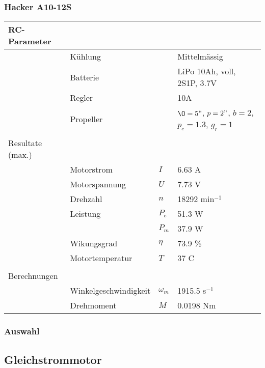 \subsubsection*{Hacker A10-12S}
\begin{table}[h!]
	\centering
	\begin{tabular}{l l l l}
		RC-Parameter & & & \\ \hline
			& Kühlung	& & Mittelmässig \\
			& Batterie	& & LiPo 10Ah, voll, 2S1P, 3.7V \\
			& Regler	& & 10A \\
			& Propeller	& & $\O=5"$, $p=2"$, $b=2$, $p_c=1.3$, $g_r=1$ \\
			& & & \\
		Resultate (max.) & & & \\ \hline
			& Motorstrom	& $I$	& 6.63 A \\
			& Motorspannung	& $U$	& 7.73 V \\
			& Drehzahl	& $n$	& 18292 min$^{-1}$ \\
			& Leistung 	& $P_e$	& 51.3 W \\
			&		& $P_m$	& 37.9 W \\
			& Wikungsgrad	& $\eta$& 73.9 \% \\
			& Motortemperatur
					& $T$	& 37 C \\
			& & & \\
		Berechnungen & & & \\ \hline
			& Winkelgeschwindigkeit
					& $\omega_m$	& 1915.5 s$^{-1}$ \\
			& Drehmoment	& $M$		& 0.0198 Nm
	\end{tabular}
\end{table}

\subsubsection{Auswahl}

\subsection{Gleichstrommotor}
